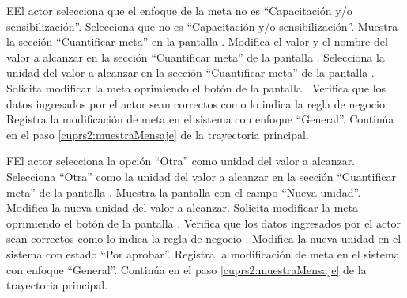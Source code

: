 \begin{UCtrayectoriaA}{E}{El actor selecciona que el enfoque de la meta no es ``Capacitación y/o sensibilización''.}
	\UCpaso[\UCactor] Selecciona que  no es ``Capacitación y/o sensibilización''. 
	\UCpaso[\UCsist] Muestra la sección ``Cuantificar meta'' en la pantalla .
	\UCpaso[\UCactor] Modifica el valor y el nombre del valor a alcanzar en la sección ``Cuantificar meta'' de la pantalla .
	\UCpaso[\UCactor] Selecciona la unidad del valor a alcanzar en la sección ``Cuantificar meta'' de la pantalla . 
	\UCpaso[\UCactor] Solicita modificar la meta oprimiendo el botón  de la pantalla .  
	\UCpaso[\UCsist] Verifica que los datos ingresados por el actor sean correctos como lo indica la regla de negocio .   
	\UCpaso[\UCsist] Registra la modificación de meta en el sistema con enfoque ``General''.
	\UCpaso[] Continúa en el paso \ref{cuprs2:muestraMensaje} de la trayectoria principal.
\end{UCtrayectoriaA}

\begin{UCtrayectoriaA}{F}{El actor selecciona la opción ``Otra'' como unidad del valor a alcanzar.}
	\UCpaso[\UCactor] Selecciona ``Otra'' como la unidad del valor a alcanzar en la sección ``Cuantificar meta'' de la pantalla .
	\UCpaso[\UCsist] Muestra la pantalla   con el campo ``Nueva unidad''.
	\UCpaso[\UCactor] Modifica la nueva unidad del valor a alcanzar.
	\UCpaso[\UCactor] Solicita modificar la meta oprimiendo el botón  de la pantalla .  
	\UCpaso[\UCsist] Verifica que los datos ingresados por el actor sean correctos como lo indica la regla de negocio .   
	\UCpaso[\UCsist] Modifica la nueva unidad en el sistema con estado ``Por aprobar''.
	\UCpaso[\UCsist] Registra la modificación de meta en el sistema con enfoque ``General''.
	\UCpaso[] Continúa en el paso \ref{cuprs2:muestraMensaje} de la trayectoria principal.
\end{UCtrayectoriaA} 

